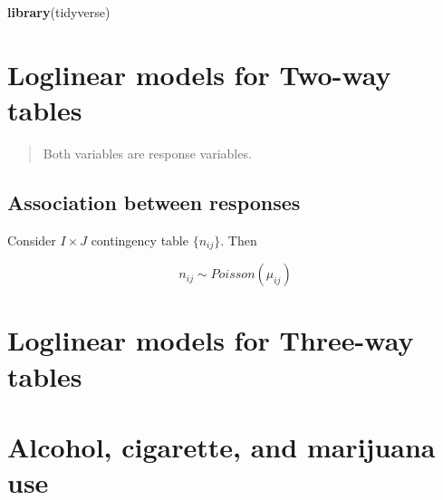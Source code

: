 \documentclass[]{book}
\newenvironment{Shaded}{\begin{snugshade}}{\end{snugshade}}
\newcommand{\CommentTok}[1]{\textcolor[rgb]{0.56,0.35,0.01}{\textit{#1}}}
\newcommand{\DataTypeTok}[1]{\textcolor[rgb]{0.13,0.29,0.53}{#1}}
\newcommand{\KeywordTok}[1]{\textcolor[rgb]{0.13,0.29,0.53}{\textbf{#1}}}
\newcommand{\NormalTok}[1]{#1}
\newcommand{\OperatorTok}[1]{\textcolor[rgb]{0.81,0.36,0.00}{\textbf{#1}}}
\newcommand{\StringTok}[1]{\textcolor[rgb]{0.31,0.60,0.02}{#1}}
\begin{document}
\begin{Shaded}
\begin{Highlighting}[]
\KeywordTok{library}\NormalTok{(tidyverse)}
\end{Highlighting}
\end{Shaded}

\hypertarget{loglinear-models-for-two-way-tables}{%
\section{Loglinear models for Two-way tables}\label{loglinear-models-for-two-way-tables}}

\begin{quote}
Both variables are response variables.
\end{quote}

\hypertarget{association-between-responses}{%
\subsection{Association between responses}\label{association-between-responses}}

Consider \(I \times J\) contingency table \(\{ n_{ij} \}\). Then

\[n_{ij} \sim Poisson(\mu_{ij})\]

\hypertarget{loglinear-models-for-three-way-tables}{%
\section{Loglinear models for Three-way tables}\label{loglinear-models-for-three-way-tables}}

\hypertarget{alcohol-cigarette-and-marijuana-use}{%
\section*{Alcohol, cigarette, and marijuana use}\label{alcohol-cigarette-and-marijuana-use}}

\begin{Shaded}
\end{Shaded}
\end{document}
